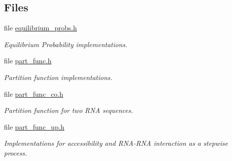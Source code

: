 \subsection*{Files}
\begin{DoxyCompactItemize}
\item 
file \hyperlink{equilibrium__probs_8h}{equilibrium\+\_\+probs.\+h}
\begin{DoxyCompactList}\small\item\em Equilibrium Probability implementations. \end{DoxyCompactList}\item 
file \hyperlink{part__func_8h}{part\+\_\+func.\+h}
\begin{DoxyCompactList}\small\item\em Partition function implementations. \end{DoxyCompactList}\item 
file \hyperlink{part__func__co_8h}{part\+\_\+func\+\_\+co.\+h}
\begin{DoxyCompactList}\small\item\em Partition function for two R\+NA sequences. \end{DoxyCompactList}\item 
file \hyperlink{part__func__up_8h}{part\+\_\+func\+\_\+up.\+h}
\begin{DoxyCompactList}\small\item\em Implementations for accessibility and R\+N\+A-\/\+R\+NA interaction as a stepwise process. \end{DoxyCompactList}\end{DoxyCompactItemize}
